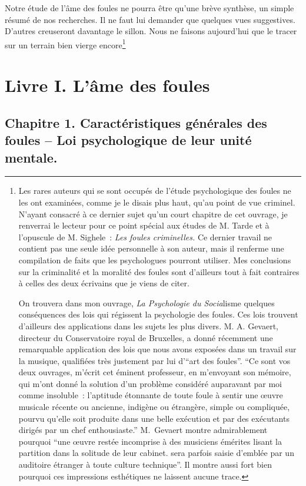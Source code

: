 \documentclass[french,twoside]{book} %
\begin{document}
Notre étude de l’âme des foules ne pourra être qu’une brève synthèse, un simple résumé de nos recherches. Il ne faut lui demander que quelques vues suggestives. D’autres creuseront davantage le sillon. Nous ne faisons aujourd’hui que le tracer sur un terrain bien vierge encore\footnote{ \noindent Les rares auteurs qui se sont occupés de l’étude psychologique des foules ne les ont examinées, comme je le disais plus haut, qu’au point de vue criminel. N’ayant consacré à ce dernier sujet qu’un court chapitre de cet ouvrage, je renverrai le lecteur pour ce point spécial aux études de M. Tarde et à l’opuscule de M. Sighele : \emph{Les foules criminelles.} Ce dernier travail ne contient pas une seule idée personnelle à son auteur, mais il renferme une compilation de faits que les psychologues pourront utiliser. Mes conclusions sur la cri­minalité et la moralité des foules sont d’ailleurs tout à fait contraires à celles des deux écrivains que je viens de citer.\par
 On trouvera dans mon ouvrage, \emph{La Psychologie du Socia}­lisme quelques conséquences des lois qui régissent la psychologie des foules. Ces lois trouvent d’ailleurs des applica­tions dans les sujets les plus divers. M. A. Gevaert, directeur du Conservatoire royal de Bruxelles, a donné récemment une remarquable application des lois que nous avons expo­sées dans un travail sur la musique, qualifiées très juste­ment par lui d’“art des foules”. “Ce sont vos deux ouvrages, m’écrit cet éminent professeur, en m’envoyant son mémoire, qui m’ont donné la solution d’un problème considéré aupa­ravant par moi comme insoluble : l’aptitude étonnante de toute foule à sentir une œuvre musicale récente ou ancienne, indigène ou étrangère, simple ou compliquée, pourvu qu’elle soit produite dans une belle exécution et par des exécutants dirigés par un chef enthousiaste.” M. Gevaert montre admirablement pourquoi “une œuvre restée incomprise à des musi­ciens émérites lisant la partition dans la solitude de leur cabinet. sera parfois saisie d’emblée par un auditoire étran­ger à toute culture technique”. Il montre aussi fort bien pourquoi ces impressions esthétiques ne laissent aucune trace.
}
\section[{Livre I. L’âme des foules}]{Livre I. L’âme des foules}\renewcommand{\leftmark}{Livre I. L’âme des foules}

\subsection[{Chapitre 1. Caractéristiques générales des foules – Loi psychologique de leur unité mentale.}]{Chapitre 1. Caractéristiques générales des foules – Loi psychologique de leur unité mentale.}
\end{document}
